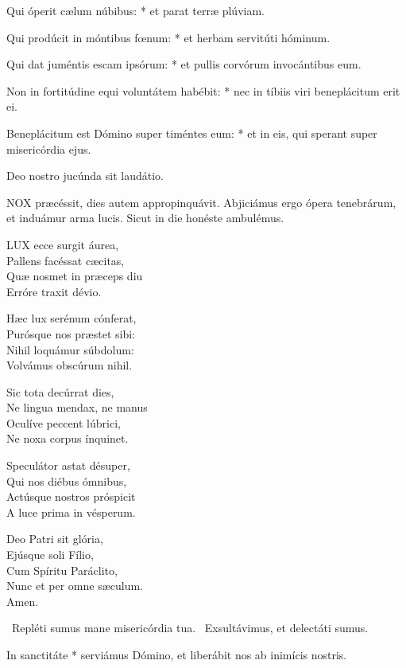 Qui óperit cælum núbibus: * et parat terræ plúviam.

Qui prodúcit in móntibus fœnum: * et herbam servitúti hóminum.

Qui dat juméntis escam ipsórum: * et pullis corvórum invocántibus eum.

Non in fortitúdine equi voluntátem habébit: * nec in tíbiis viri beneplácitum erit ei.

Beneplácitum est Dómino super timéntes eum: * et in eis, qui sperant super misericórdia ejus.

 Deo nostro jucúnda sit laudátio.



\lettrine[lines=2]{N}{OX} præcéssit, dies autem appropinquávit. Abjiciámus ergo ópera tenebrárum, et induámur arma lucis. Sicut in die honéste ambulémus.


\lettrine[lines=2]{L}{UX} ecce surgit áurea,\\
Pallens facéssat cæcitas,\\
Quæ nosmet in præceps diu\\
Erróre traxit dévio.

Hæc lux serénum cónferat,\\
Purósque nos præstet sibi:\\
Nihil loquámur súbdolum:\\
Volvámus obscúrum nihil.

Sic tota decúrrat dies,\\
Ne lingua mendax, ne manus\\
Oculíve peccent lúbrici,\\
Ne noxa corpus ínquinet.

Speculátor astat désuper,\\
Qui nos diébus ómnibus,\\
Actúsque nostros próspicit\\
A luce prima in vésperum.

Deo Patri sit glória,\\
Ejúsque soli Fílio,\\
Cum Spíritu Paráclito,\\
Nunc et per omne sæculum.\\
Amen.

\V\ Repléti sumus mane misericórdia tua. \R\ Exsultávimus, et delectáti sumus.

 In sanctitáte * serviámus Dómino, et liberábit nos ab inimícis nostris.

